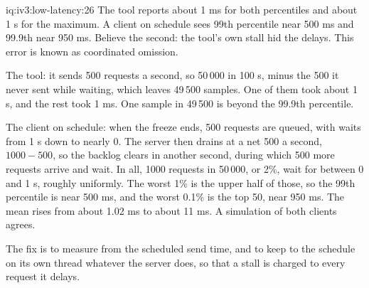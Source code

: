 \begin{solution}{iq:iv3:low-latency:26}
The tool reports about 1 ms for both percentiles and about 1 s for the maximum. A client on schedule sees 99th percentile near 500 ms and 99.9th near 950 ms. Believe the second: the tool's own stall hid the delays. This error is known as coordinated omission.

The tool: it sends 500 requests a second, so 50\,000 in 100 s, minus the 500 it never sent while waiting, which leaves 49\,500 samples. One of them took about 1 s, and the rest took 1 ms. One sample in 49\,500 is beyond the 99.9th percentile.

The client on schedule: when the freeze ends, 500 requests are queued, with waits from 1 s down to nearly 0. The server then drains at a net 500 a second, $1000 - 500$, so the backlog clears in another second, during which 500 more requests arrive and wait. In all, 1000 requests in 50\,000, or 2\%, wait for between 0 and 1 s, roughly uniformly. The worst 1\% is the upper half of those, so the 99th percentile is near 500 ms, and the worst 0.1\% is the top 50, near 950 ms. The mean rises from about 1.02 ms to about 11 ms. A simulation of both clients agrees.

The fix is to measure from the scheduled send time, and to keep to the schedule on its own thread whatever the server does, so that a stall is charged to every request it delays.

\end{solution}

